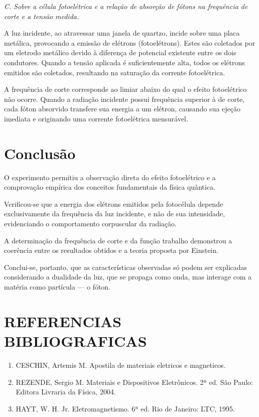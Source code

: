 \documentclass[10pt,twocolumn,letterpaper]{article}
\begin{document}
\noindent\textit{C. Sobre a célula fotoelétrica e a relação de absorção de
fótons na frequência de corte e a tensão medida.}

\hspace{1cm} A luz incidente, ao atravessar uma janela de quartzo, incide sobre uma placa metálica, provocando a emissão de elétrons (fotoelétrons). Estes são coletados por um eletrodo metálico devido à diferença de potencial existente entre os dois condutores.
Quando a tensão aplicada é suficientemente alta, todos os elétrons emitidos são coletados, resultando na saturação da corrente fotoelétrica.

\hspace{1cm} A frequência de corte corresponde ao limiar abaixo do qual o efeito fotoelétrico não ocorre. Quando a radiação incidente possui frequência superior à de corte, cada fóton absorvido transfere sua energia a um elétron, causando sua ejeção imediata e originando uma corrente fotoelétrica mensurável.


\section{Conclusão}

\hspace{1cm} O experimento permitiu a observação direta do efeito fotoelétrico e a comprovação empírica dos conceitos fundamentais da física quântica.

\hspace{1cm} Verificou-se que a energia dos elétrons emitidos pela fotocélula depende exclusivamente da frequência da luz incidente, e não de sua intensidade, evidenciando o comportamento corpuscular da radiação.

\hspace{1cm} A determinação da frequência de corte e da função trabalho demonstrou a coerência entre os resultados obtidos e a teoria proposta por Einstein.

\hspace{1cm} Conclui-se, portanto, que as características observadas só podem ser explicadas considerando a dualidade da luz, que se propaga como onda, mas interage com a matéria como partícula — o fóton.

\section{REFERENCIAS BIBLIOGRAFICAS}

{\small
\begin{enumerate}

    \item CESCHIN, Artemis M. Apostila de materiais eletricos e magneticos.

    \item REZENDE, Sergio M. Materiais e Dispositivos Eletrônicos. 2ª ed. São Paulo: Editora Livraria da Física, 2004.

    \item HAYT, W. H. Jr. Eletromagnetismo. 6ª ed. Rio de Janeiro: LTC, 1995.
    
\end{enumerate}
}
\end{document}
